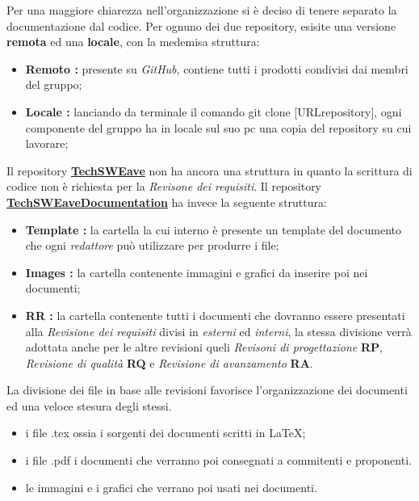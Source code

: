         Per una maggiore chiarezza nell'organizzazione si è deciso di tenere separato la documentazione dal codice.
        Per ognuno dei due repository, esisite una versione \textbf{remota} ed una \textbf{locale}, con la medemisa struttura: 
        \begin{itemize}
            \item \textbf{Remoto :} presente su \textit{GitHub}, contiene tutti i prodotti condivisi dai membri del gruppo;
            \item \textbf{Locale :} lanciando da terminale il comando {\selectfont git clone [URLrepository]}, ogni componente del gruppo ha in locale sul suo pc una copia del repository su cui lavorare;
        \end{itemize} 
        Il repository \textbf{\href{https://github.com/techsweave/TechSWEave.git}{TechSWEave}} non ha ancora una struttura in quanto la scrittura di codice non è richiesta per la \textit{Revisone dei requisiti}. 
        Il repository  \textbf{\href{https://github.com/techsweave/TechSWEaveDocumentation.git}{TechSWEaveDocumentation}} ha invece la seguente struttura:
        \begin{itemize}
            \item \textbf{Template :} la cartella la cui interno è presente un template del documento che ogni \textit{redattore} può utilizzare per produrre i file;
            \item \textbf{Images :} la cartella contenente immagini e grafici da inserire poi nei documenti;
            \item \textbf{RR :} la cartella contenente tutti i documenti che dovranno essere presentati alla \textit{Revisione dei requisiti} divisi in \textit{esterni} ed \textit{interni}, la stessa divisione verrà adottata anche per le altre revisioni queli \textit{Revisoni di progettazione} \textbf{RP}, \textit{Revisione di qualità} \textbf{RQ} e \textit{Revisione di avanzamento} \textbf{RA}.
        \end{itemize}
        La divisione dei file in base alle revisioni favorisce l'organizzazione dei documenti ed una veloce stesura degli stessi.
        \begin{itemize}
            \item i file {\selectfont .tex} ossia i sorgenti dei documenti scritti in \LaTeX;
            \item i file {\selectfont .pdf} i documenti che verranno poi consegnati a commitenti e proponenti.
            \item le immagini e i grafici che verrano poi usati nei documenti.
        \end{itemize}

